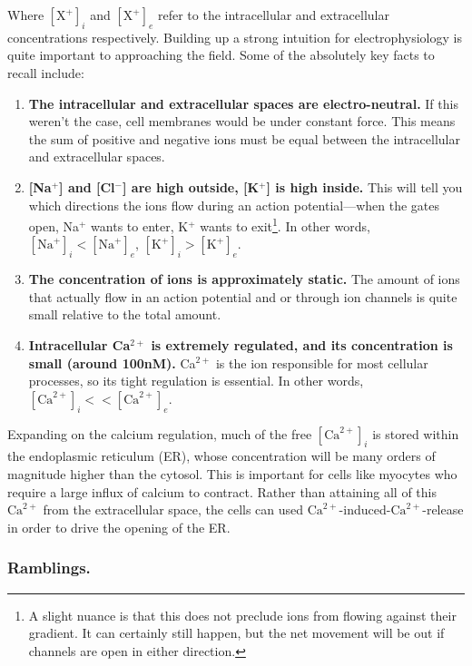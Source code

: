 \documentclass[12pt]{report}
\begin{document}
Where $[\mathrm{X}^+]_i$ and $[\mathrm{X}^+]_e$ refer to the intracellular and extracellular concentrations respectively. Building up a strong intuition for electrophysiology is quite important to approaching the field. Some of the absolutely key facts to recall include:

\begin{enumerate}
\item \textbf{The intracellular and extracellular spaces are electro-neutral.} If this weren't the case, cell membranes would be under constant force. This means the sum of positive and negative ions must be equal between the intracellular and extracellular spaces. 
\item \textbf{[Na$^+$] and [Cl$^-$] are high outside, [K$^+$] is high inside.} This will tell you which directions the ions flow during an action potential---when the gates open, Na$^+$ wants to enter, K$^+$ wants to exit\footnote{A slight nuance is that this does not preclude ions from flowing against their gradient. It can certainly still happen, but the net movement will be out if channels are open in either direction.}. In other words, $[\mathrm{Na}^+]_i < [\mathrm{Na}^+]_e$, $[\mathrm{K}^+]_i > [\mathrm{K}^+]_e$.  
\item \textbf{The concentration of ions is approximately static.} The amount of ions that actually flow in an action potential and or through ion channels is quite small relative to the total amount.
\item \textbf{Intracellular Ca$^{2+}$ is extremely regulated, and its concentration is small (around 100nM).} Ca$^{2+}$ is the ion responsible for most cellular processes, so its tight regulation is essential. In other words, $[\mathrm{Ca}^{2+}]_i << [\mathrm{Ca}^{2+}]_e$. 
\end{enumerate}

Expanding on the calcium regulation, much of the free $[\mathrm{Ca}^{2+}]_i$ is stored within the endoplasmic reticulum (ER), whose concentration will be many orders of magnitude higher than the cytosol. This is important for cells like myocytes who require a large influx of calcium to contract. Rather than attaining all of this $\mathrm{Ca}^{2+}$ from the extracellular space, the cells can used $\mathrm{Ca}^{2+}$-induced-$\mathrm{Ca}^{2+}$-release in order to drive the opening of the ER.\newline

\subsubsection{Ramblings.}
\end{document}
